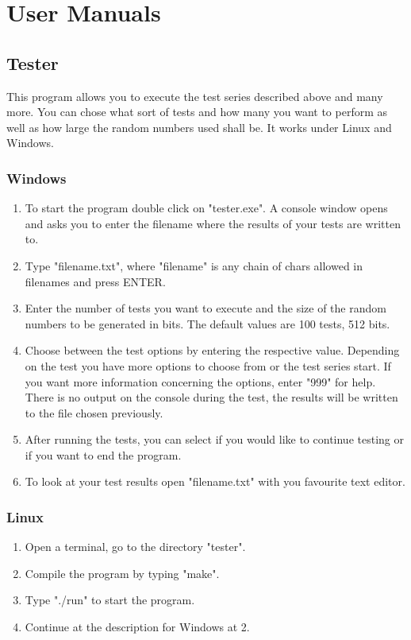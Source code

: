 \documentclass[a4paper, 11pt]{article}
\begin{document}
  \appendix 
 \section{User Manuals} 
 \subsection{Tester} 
 This program allows you to execute the test series described above and many more. You can chose what sort of tests and how many you want to perform as well as how large the random numbers used shall be. It works under Linux and Windows. 
 \subsubsection{Windows} 
 \begin{enumerate} 
 \item To start the program double click on "tester.exe". A console window opens and asks you to enter the filename where the results of your tests are written to. 
 \item Type "filename.txt", where "filename" is any chain of chars allowed in filenames and press ENTER. 
 \item Enter the number of tests you want to execute and the size of the random numbers to be generated in bits. The default values are 100 tests, 512 bits. 
 \item Choose between the test options by entering the respective value. Depending on the test you have more options to choose from or the test series start. If you want more information concerning the options, enter "999" for help. There is no output on the console during the test, the results will be written to the file chosen previously. 
 \item After running the tests, you can select if you would like to continue testing or if you want to end the program. 
 \item To look at your test results open "filename.txt" with you favourite text editor. 
 \end{enumerate} 
 \subsubsection{Linux} 
 \begin{enumerate} 
 \item Open a terminal, go to the directory "tester". 
 \item Compile the program by typing "make". 
 \item Type "./run" to start the program. 
 \item Continue at the description for Windows at 2. 
 \end{enumerate} 
 
\end{document}
